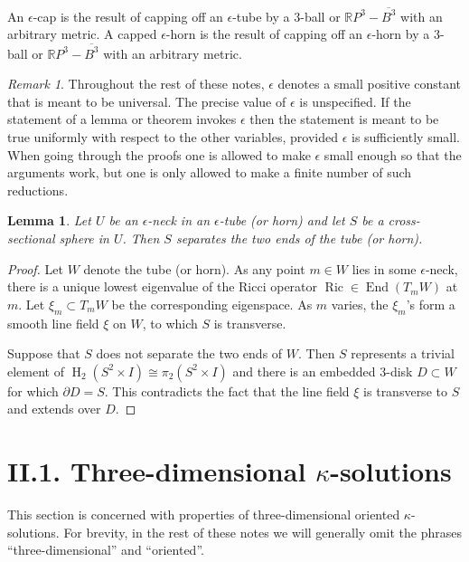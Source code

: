 \documentclass[12pt]{amsart}
\newcommand{\End}{\operatorname{End}}
\newcommand{\HH}{\operatorname{H}}
\newcommand{\R}{{\mathbb R}}
\newcommand{\Ric}{\operatorname{Ric}}
\newcommand{\eps}{\epsilon}
\numberwithin{equation}{section}
\theoremstyle{plain}
\newtheorem{lemma}[equation]{Lemma}
\theoremstyle{definition}
\theoremstyle{remark}
\newtheorem{remark}[equation]{Remark}
\begin{document}
An $\epsilon$-cap is the result of capping off an $\epsilon$-tube by a
$3$-ball or $\R P^3 - \overline{B^3}$
with an arbitrary metric.  A capped $\epsilon$-horn
is the result of capping off an $\epsilon$-horn by a
$3$-ball or $\R P^3 - \overline{B^3}$ with an arbitrary metric.

\begin{remark}
\label{remepsilon}
Throughout the rest of these notes, $\epsilon$ denotes a small
positive constant that is meant to be universal.  The precise value
of $\epsilon$ is unspecified.  If the statement of a lemma or
theorem invokes $\epsilon$ then the statement is meant to be true
uniformly with respect to the other variables, provided $\eps$ is
sufficiently small. When going through
the proofs one is allowed to make $\epsilon$ small enough
so that the arguments work, but one is only allowed to make a
finite number of such reductions.  
\end{remark}

\begin{lemma}
Let $U$ be
an $\epsilon$-neck in an $\epsilon$-tube (or horn) and let 
$S$ be a cross-sectional
sphere in $U$. Then $S$ separates the two ends of the tube (or horn).
\end{lemma}
\begin{proof}
Let $W$ denote the tube (or horn).
As any point $m \in W$ lies in some $\epsilon$-neck,
there is a unique lowest eigenvalue of the Ricci operator
$\Ric  \in \End(T_m W)$ at $m$. Let $\xi_m \subset T_mW$ be the
corresponding eigenspace.  As $m$ varies, the 
$\xi_m$'s form a smooth
line field $\xi$ on $W$, to which $S$ is transverse.

Suppose that $S$ does not separate the two ends of $W$. 
Then $S$ represents a trivial element of
$\HH_2(S^2 \times I) \cong \pi_2(S^2 \times I)$ and
there is an embedded $3$-disk $D \subset W$ for which
$\partial D = S$. This contradicts the fact that
the line field $\xi$ is transverse to $S$ and extends over $D$.
\end{proof}


\section{II.1. Three-dimensional $\kappa$-solutions} \label{II.1}

This section is concerned with properties of three-dimensional oriented
$\kappa$-solutions. For brevity, in the rest of these notes we will generally omit 
the phrases ``three-dimensional'' and ``oriented''.
\end{document}
